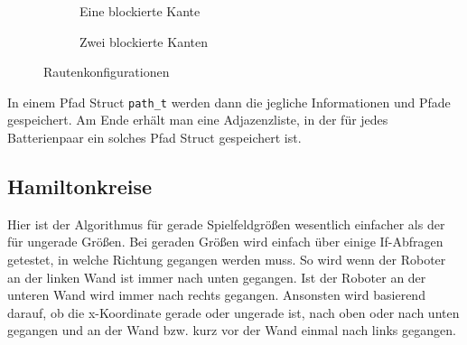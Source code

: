 \documentclass[a4paper,10pt,ngerman]{scrartcl}
\begin{document}
\begin{figure}[ht]
\begin{subfigure}{0.33\textwidth}
    \caption{Eine blockierte Kante}
  \end{subfigure}%
  \begin{subfigure}{0.33\textwidth}
    \centering
    \caption{Zwei blockierte Kanten}
  \end{subfigure}%
  \caption{Rautenkonfigurationen}
  \label{fig:diamondconfig}
\end{figure}

In einem Pfad Struct \texttt{path\_t} werden dann die jegliche Informationen und Pfade gespeichert.
Am Ende erhält man eine Adjazenzliste, in der für jedes Batterienpaar ein solches Pfad Struct gespeichert ist.



\subsection{Hamiltonkreise}
Hier ist der Algorithmus für gerade Spielfeldgrößen wesentlich einfacher als der für ungerade Größen.
Bei geraden Größen wird einfach über einige If-Abfragen getestet, in welche Richtung gegangen werden muss.
So wird wenn der Roboter an der linken Wand ist immer nach unten gegangen.
Ist der Roboter an der unteren Wand wird immer nach rechts gegangen.
Ansonsten wird basierend darauf, ob die x-Koordinate gerade oder ungerade ist, nach oben oder nach unten gegangen
und an der Wand bzw. kurz vor der Wand einmal nach links gegangen.
\end{document}
